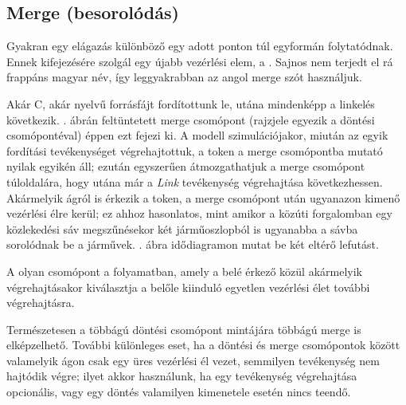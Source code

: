 \subsection{Merge (besorolódás)}
Gyakran egy elágazás különböző  egy adott ponton túl egyformán folytatódnak. Ennek kifejezésére szolgál egy újabb vezérlési elem, a . Sajnos nem terjedt el rá frappáns magyar név, így leggyakrabban az angol merge szót használjuk.

\begin{pelda}
Akár C, akár \cpp nyelvű forrásfájt fordítottunk le, utána mindenképp a linkelés következik. . ábrán feltüntetett merge csomópont (rajzjele egyezik a döntési csomópontéval) éppen ezt fejezi ki. A modell szimulációjakor, miután az egyik fordítási tevékenységet végrehajtottuk, a token a merge csomópontba mutató nyilak egyikén áll; ezután egyszerűen átmozgathatjuk a merge csomópont túloldalára, hogy utána már a \emph{Link} tevékenység végrehajtása következhessen. Akármelyik ágról is érkezik a token, a merge csomópont után ugyanazon kimenő vezérlési élre kerül; ez ahhoz hasonlatos, mint amikor a közúti forgalomban egy közlekedési sáv megszűnésekor két járműoszlopból is ugyanabba a sávba sorolódnak be a járművek. . ábra idődiagramon mutat be két eltérő lefutást.  
\end{pelda}



\begin{definicio}
	A  olyan csomópont a folyamatban, amely a belé érkező  közül akármelyik végrehajtásakor kiválasztja a belőle kiinduló egyetlen vezérlési élet további végrehajtásra. 
\end{definicio}

Természetesen a többágú döntési csomópont mintájára többágú merge is elképzelhető. További különleges eset, ha a döntési és merge csomópontok között valamelyik ágon csak egy üres vezérlési él vezet, semmilyen tevékenység nem hajtódik végre; ilyet akkor használunk, ha egy tevékenység végrehajtása opcionális, vagy egy döntés valamilyen kimenetele esetén nincs teendő.

